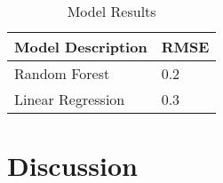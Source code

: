 \documentclass[11pt, oneside]{article}   	%
\begin{document}
\begin{table}[]
\centering

\label{my-label}
\begin{tabular}{@{}ll@{}}
\toprule
\textbf{Model Description} & \textbf{RMSE} \\ \midrule
Random Forest  & 0.2  \\
Linear Regression & 0.3  \\ \bottomrule
\end{tabular}
\caption{Model Results}
\end{table}

\section{Discussion}

\end{document}
